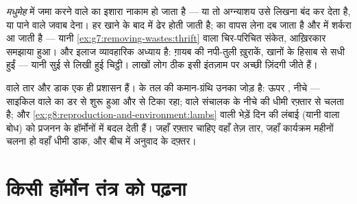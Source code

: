 \begin{example}[जब प्रतिपुष्टि नाकाम होती है: मधुमेह]\label{ex:g8:hormonal-communication:diabetes}
\emph{मधुमेह} में जमा करने वाले  का इशारा नाकाम हो
जाता है --- या तो अग्न्याशय उसे लिखना बंद कर देता है, या पाने वाले जवाब
देना। हर खाने के बाद   में ढेर होती जाती है;  का वापस
लेना दब जाता है और  में शर्करा आ जाती है --- यानी
\cref{ex:g7:removing-wastes:thrift} वाला चिर-परिचित संकेत, आख़िरकार
समझाया हुआ। और इलाज व्यावहारिक अध्याय है: ग़ायब  की नपी-तुली
ख़ुराकें, खानों के हिसाब से सधी हुईं --- यानी सुई से लिखी हुई चिट्ठी।
लाखों लोग ठीक इसी इंतज़ाम पर अच्छी ज़िंदगी जीते हैं।
\end{example}

\begin{remark}[दोनों तंत्रों की साझेदारी]\label{rem:g8:hormonal-communication:partnership}
 वाले तार और डाक एक ही
प्रशासन हैं।  के तल की कमान-ग्रंथि उनका जोड़ है: ऊपर , नीचे  --- साइकिल वाले का डर  से शुरू हुआ और
 से टिका रहा;   वाले संचालक के नीचे  की
धीमी रफ़्तार से चलता है; और
\cref{ex:g8:reproduction-and-environment:lambs} वाली भेड़ें दिन की
लंबाई (यानी  वाला बोध) को प्रजनन के हॉर्मोनों में बदल देती हैं।
जहाँ रफ़्तार चाहिए वहाँ तेज़ तार, जहाँ कार्यक्रम महीनों चलना हो वहाँ धीमी
डाक, और बीच में अनुवाद के दफ़्तर।
\end{remark}

\section{किसी हॉर्मोन तंत्र को पढ़ना}

